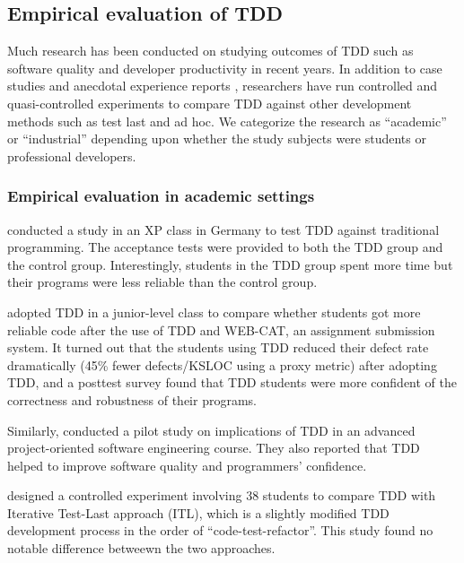 \documentclass[smallextended]{svjour3}     %
\begin{document}
\subsection{Empirical evaluation of TDD}
\label{sec:related-empirical}

Much research has been conducted on studying outcomes of TDD
such as software quality and developer productivity in recent years. In
addition to case studies and anecdotal experience reports 
\citep{George:04,Maximilien:03,Williams:03,Kaufmann:03,Edwards:04,Bhat:06,Damm:06,Sanchez:07,Janzen:08},
researchers have run controlled and quasi-controlled experiments
\citep{Muller:02,Matjaz:03,Erdogmus:05,Janzen:08,Madeyski:07,Siniaalto:07,Gupta:07} to compare TDD against other
development methods such as test last and ad hoc. We categorize the
research as ``academic'' or ``industrial'' depending upon whether the study
subjects were students or professional developers.

\subsubsection{Empirical evaluation in academic settings}

\cite{Muller:02} conducted a study in an XP class in
Germany to test TDD against traditional programming.  The acceptance tests
were provided to both the TDD group and the control group. Interestingly,
students in the TDD group spent more time but their programs were less
reliable than the control group.

\cite{Edwards:04} adopted TDD in a junior-level class to compare
whether students got more reliable code after the use of TDD and WEB-CAT,
an assignment submission system. It turned out that the students using TDD
reduced their defect rate dramatically (45\% fewer defects/KSLOC using a
proxy metric) after adopting TDD, and a posttest survey found that TDD
students were more confident of the correctness and robustness of their
programs.

Similarly, \cite{Kaufmann:03} conducted a pilot study
on implications of TDD in an advanced project-oriented software engineering
course. They also reported that TDD helped to improve software quality and
programmers' confidence.

\cite{Matjaz:03} designed a controlled experiment involving 38 students to compare TDD with
Iterative Test-Last approach (ITL), which is a slightly modified TDD
development process in the order of ``code-test-refactor''.  This study
found no notable difference betweewn the two approaches.
\end{document}
